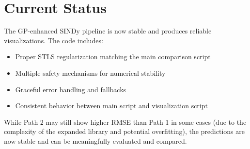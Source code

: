 \documentclass[11pt]{article}
\begin{document}
\section{Current Status}

The GP-enhanced SINDy pipeline is now stable and produces reliable visualizations. The code includes:
\begin{itemize}
    \item Proper STLS regularization matching the main comparison script
    \item Multiple safety mechanisms for numerical stability
    \item Graceful error handling and fallbacks
    \item Consistent behavior between main script and visualization script
\end{itemize}

While Path 2 may still show higher RMSE than Path 1 in some cases (due to the complexity of the expanded library and potential overfitting), the predictions are now stable and can be meaningfully evaluated and compared.
\end{document}
